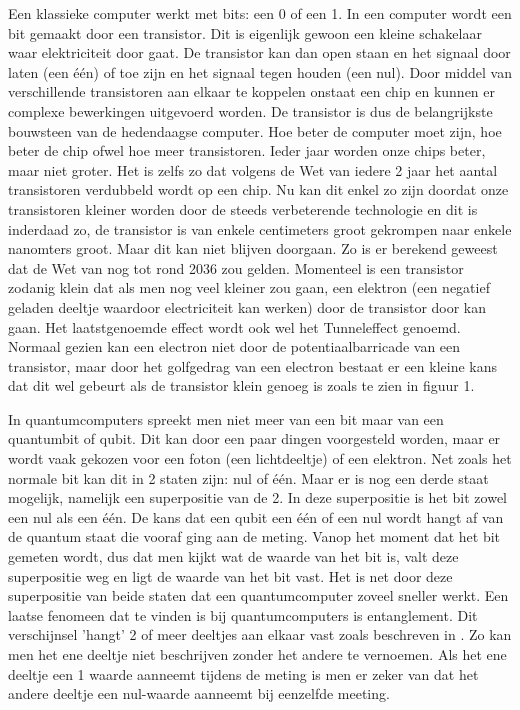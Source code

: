 Een klassieke computer werkt met bits: een 0 of een 1. In een computer wordt een bit gemaakt door een transistor.
Dit is eigenlijk gewoon een kleine schakelaar waar elektriciteit door gaat.
De transistor kan dan open staan en het signaal door laten (een één) of toe zijn en het signaal tegen houden (een nul).
Door middel van verschillende transistoren aan elkaar te koppelen onstaat een chip en kunnen er complexe bewerkingen uitgevoerd worden.
De transistor is dus de belangrijkste bouwsteen van de hedendaagse computer. Hoe beter de computer moet zijn, hoe beter de chip ofwel hoe meer transistoren.
Ieder jaar worden onze chips beter, maar niet groter. Het is zelfs zo dat volgens de Wet van \textcite{Moore1965} iedere 2 jaar het aantal transistoren verdubbeld wordt op een chip.
Nu kan dit enkel zo zijn doordat onze transistoren kleiner worden door de steeds verbeterende technologie en dit is inderdaad zo, de transistor is van enkele centimeters groot gekrompen naar enkele nanomters groot.
Maar dit kan niet blijven doorgaan. Zo is er berekend geweest dat de Wet van \textcite{Moore1965} nog tot rond 2036 zou gelden\autocite{Powell2008}.  Momenteel is een transistor zodanig klein dat als men nog veel kleiner zou gaan, een elektron (een negatief geladen deeltje waardoor electriciteit kan werken) door de transistor door kan gaan.
Het laatstgenoemde effect wordt ook wel het Tunneleffect genoemd. Normaal gezien kan een electron niet door de potentiaalbarricade van een transistor, maar door het golfgedrag van een electron bestaat er een kleine kans dat dit wel gebeurt als de transistor klein genoeg is zoals te zien in figuur 1.

In quantumcomputers spreekt men niet meer van een bit maar van een quantumbit of qubit. Dit kan door een paar dingen voorgesteld worden, maar er wordt vaak gekozen voor een foton (een lichtdeeltje) of een elektron. 
Net zoals het normale bit kan dit in 2 staten zijn: nul of één. Maar er is nog een derde staat mogelijk, namelijk een superpositie van de 2.
In deze superpositie is het bit zowel een nul als een één. De kans dat een qubit een één of een nul wordt hangt af van de quantum staat die vooraf ging aan de meting.
Vanop het moment dat het bit gemeten wordt, dus dat men kijkt wat de waarde van het bit is, valt deze superpositie weg en ligt de waarde van het bit vast.
Het is net door deze superpositie van beide staten dat een quantumcomputer zoveel sneller werkt.
Een laatse fenomeen dat te vinden is bij quantumcomputers is entanglement. Dit verschijnsel 'hangt' 2 of meer deeltjes aan elkaar vast zoals beschreven in \textcite{Bengtsson2017}.
Zo kan men het ene deeltje niet beschrijven zonder het andere te vernoemen. Als het ene deeltje een 1 waarde aanneemt tijdens de meting is men er zeker van dat het andere deeltje een nul-waarde aanneemt bij eenzelfde meeting.

